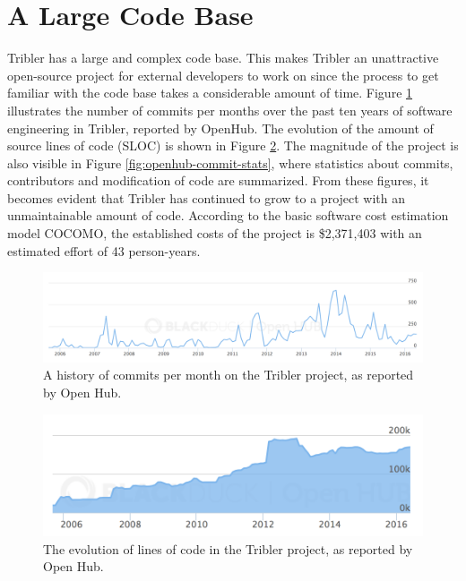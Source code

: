 \section{A Large Code Base}
Tribler has a large and complex code base. This makes Tribler an unattractive open-source project for external developers to work on since the process to get familiar with the code base takes a considerable amount of time. Figure \ref{fig:openhub-commits} illustrates the number of commits per months over the past ten years of software engineering in Tribler, reported by OpenHub\cite{openhubtribler}. The evolution of the amount of source lines of code (SLOC) is shown in Figure \ref{fig:openhub-loc}. The magnitude of the project is also visible in Figure \ref{fig:openhub-commit-stats}, where statistics about commits, contributors and modification of code are summarized. From these figures, it becomes evident that Tribler has continued to grow to a project with an unmaintainable amount of code. According to the basic software cost estimation model COCOMO\cite{kemerer1987empirical}, the established costs of the project is \$2,371,403 with an estimated effort of 43 person-years.\\

\begin{figure}[t]
	\centering
	\includegraphics[width=\columnwidth]{images/problem_description/openhub_commits}
	\caption{A history of commits per month on the Tribler project, as reported by Open Hub.}
	\label{fig:openhub-commits}
\end{figure}

\begin{figure}[t]
	\centering
	\includegraphics[width=\columnwidth]{images/openhub_loc}
	\caption{The evolution of lines of code in the Tribler project, as reported by Open Hub.}
	\label{fig:openhub-loc}
\end{figure}

